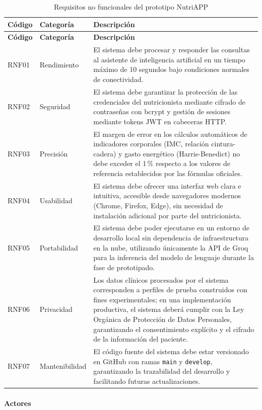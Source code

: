 {\small
\begin{longtable}{|p{1.5cm}|p{2.6cm}|p{9.4cm}|}
\caption{Requisitos no funcionales del prototipo NutriAPP}\label{tab:rnf}\\
\hline
\textbf{Código} & \textbf{Categoría} & \textbf{Descripción} \\ \hline
\endfirsthead
\hline
\textbf{Código} & \textbf{Categoría} & \textbf{Descripción} \\ \hline
\endhead
RNF01 & Rendimiento & El sistema debe procesar y responder las consultas al asistente de inteligencia artificial en un tiempo máximo de 10 segundos bajo condiciones normales de conectividad. \\ \hline
RNF02 & Seguridad & El sistema debe garantizar la protección de las credenciales del nutricionista mediante cifrado de contraseñas con bcrypt y gestión de sesiones mediante tokens JWT en cabeceras HTTP. \\ \hline
RNF03 & Precisión & El margen de error en los cálculos automáticos de indicadores corporales (IMC, relación cintura-cadera) y gasto energético (Harris-Benedict) no debe exceder el 1\,\% respecto a los valores de referencia establecidos por las fórmulas oficiales. \\ \hline
RNF04 & Usabilidad & El sistema debe ofrecer una interfaz web clara e intuitiva, accesible desde navegadores modernos (Chrome, Firefox, Edge), sin necesidad de instalación adicional por parte del nutricionista. \\ \hline
RNF05 & Portabilidad & El sistema debe poder ejecutarse en un entorno de desarrollo local sin dependencia de infraestructura en la nube, utilizando únicamente la API de Groq para la inferencia del modelo de lenguaje durante la fase de prototipado. \\ \hline
RNF06 & Privacidad & Los datos clínicos procesados por el sistema corresponden a perfiles de prueba construidos con fines experimentales; en una implementación productiva, el sistema deberá cumplir con la Ley Orgánica de Protección de Datos Personales, garantizando el consentimiento explícito y el cifrado de la información del paciente. \\ \hline
RNF07 & Mantenibilidad & El código fuente del sistema debe estar versionado en GitHub con ramas \texttt{main} y \texttt{develop}, garantizando la trazabilidad del desarrollo y facilitando futuras actualizaciones. \\ \hline
\end{longtable}
}

\paragraph{Actores}

